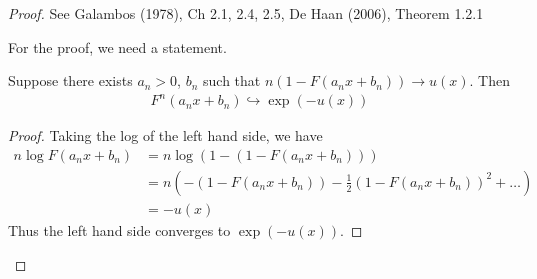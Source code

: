 \begin{proof}
  See Galambos (1978), Ch 2.1, 2.4, 2.5, De Haan (2006), Theorem 1.2.1

  For the proof, we need a statement.

  \begin{lem}[$\star$]
    Suppose there exists $a_{n} > 0$, $b_{n}$ such that $n(1 - F(a_{n}
    x + b_{n})) \rightarrow{ u(x)}$.  Then
    \begin{align}
      \label{eq:125}
      F^{n}(a_{n} x + b_{n}) \hookrightarrow \exp(-u(x))
    \end{align}
  \end{lem}

  \begin{proof}
    Taking the log of the left hand side, we have
    \begin{align}
      \label{eq:126}
      n \log F(a_{n} x + b_{n}) &= n \log (1 - (1 - F(a_{n} x +
      b_{n}))) \\
      &= n (-(1 - F(a_{n} x + b_{n})) - \frac{1}{2} (1 - F(a_{n}x +
      b_{n}))^{2} + \dots) \\
      &= -u(x)
    \end{align}
    Thus the left hand side converges to $\exp(-u(x))$.
  \end{proof}
\end{proof}

